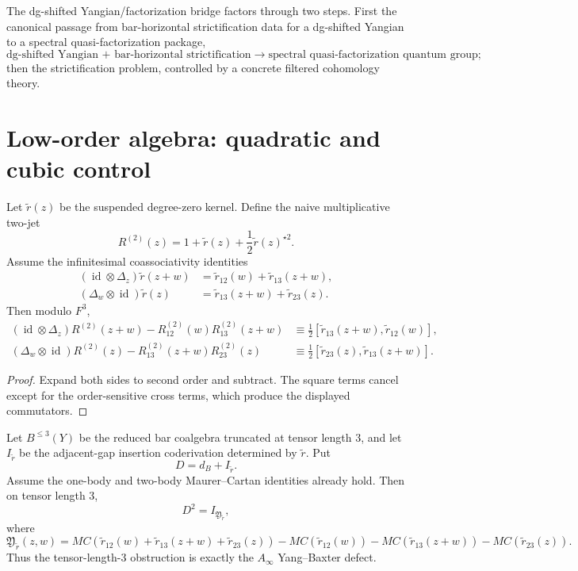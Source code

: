 \begin{conclusion}
The dg-shifted Yangian/factorization bridge factors through two steps.
First the canonical passage from bar-horizontal strictification data
for a dg-shifted Yangian to a spectral quasi-factorization package,
\[
\text{dg-shifted Yangian + bar-horizontal strictification}
\longrightarrow
\text{spectral quasi-factorization quantum group};
\]
then the strictification problem, controlled by a concrete filtered
cohomology theory.
\end{conclusion}

\section{Low-order algebra: quadratic and cubic control}

\begin{proposition}
Let $\widetilde r(z)$ be the suspended degree-zero kernel. Define the
naive multiplicative two-jet
\[
R^{(2)}(z)=1+\widetilde r(z)+\frac12\widetilde r(z)^{\star 2}.
\]
Assume the infinitesimal coassociativity identities
\begin{align*}
(\operatorname{id}\otimes \Delta_z)\widetilde r(z+w)
&=\widetilde r_{12}(w)+\widetilde r_{13}(z+w),\\
(\Delta_w\otimes \operatorname{id})\widetilde r(z)
&=\widetilde r_{13}(z+w)+\widetilde r_{23}(z).
\end{align*}
Then modulo $F^3$,
\begin{align*}
(\operatorname{id}\otimes \Delta_z)R^{(2)}(z+w)-R^{(2)}_{12}(w)R^{(2)}_{13}(z+w)
&\equiv \frac12[\widetilde r_{13}(z+w),\widetilde r_{12}(w)],\\
(\Delta_w\otimes \operatorname{id})R^{(2)}(z)-R^{(2)}_{13}(z+w)R^{(2)}_{23}(z)
&\equiv \frac12[\widetilde r_{23}(z),\widetilde r_{13}(z+w)].
\end{align*}
\end{proposition}

\begin{proof}
Expand both sides to second order and subtract. The square terms cancel
except for the order-sensitive cross terms, which produce the displayed
commutators.
\end{proof}

\begin{proposition}
Let $B^{\le 3}(Y)$ be the reduced bar coalgebra truncated at tensor
length $3$, and let $I_{\widetilde r}$ be the adjacent-gap insertion
coderivation determined by $\widetilde r$. Put
\[
D=d_B+I_{\widetilde r}.
\]
Assume the one-body and two-body Maurer--Cartan identities already
hold. Then on tensor length $3$,
\[
D^2=I_{\mathfrak Y_{\widetilde r}},
\]
where
\[
\mathfrak Y_{\widetilde r}(z,w)=
MC(\widetilde r_{12}(w)+\widetilde r_{13}(z+w)+\widetilde r_{23}(z))
-MC(\widetilde r_{12}(w))
-MC(\widetilde r_{13}(z+w))
-MC(\widetilde r_{23}(z)).
\]
Thus the tensor-length-$3$ obstruction is exactly the
$A_\infty$ Yang--Baxter defect.
\end{proposition}

